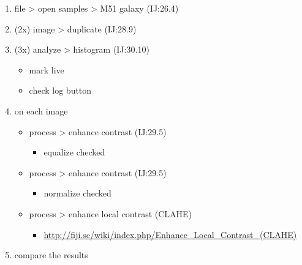 \documentclass[11pt]{article}
\begin{document}
\begin{enumerate}
\item file > open samples > M51 galaxy (IJ:26.4)
\item (2x) image > duplicate (IJ:28.9)
\item (3x) analyze > histogram (IJ:30.10)
\begin{itemize}
\item mark live
\item check log button
\end{itemize}
\item on each image
\begin{itemize}
\item process > enhance contrast (IJ:29.5)
\begin{itemize}
\item equalize checked
\end{itemize}
\item process > enhance contrast (IJ:29.5)
\begin{itemize}
\item normalize checked
\end{itemize}
\item process > enhance local contrast (CLAHE)
\begin{itemize}
\item \url{http://fiji.sc/wiki/index.php/Enhance_Local_Contrast_(CLAHE)}
\end{itemize}
\end{itemize}
\item compare the results
\end{enumerate}
\end{document}
